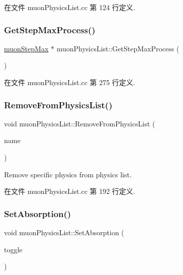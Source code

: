 在文件 muon\+Physics\+List.\+cc 第 124 行定义.

\mbox{\label{classmuonPhysicsList_a673fde0059508d78547a84db91971ce9}} 
\subsubsection{\texorpdfstring{Get\+Step\+Max\+Process()}{GetStepMaxProcess()}}
{\footnotesize\ttfamily \hyperlink{classmuonStepMax}{muon\+Step\+Max} $\ast$ muon\+Physics\+List\+::\+Get\+Step\+Max\+Process (\begin{DoxyParamCaption}{ }\end{DoxyParamCaption})}



在文件 muon\+Physics\+List.\+cc 第 275 行定义.

\mbox{\label{classmuonPhysicsList_aaba742da0c9dc44a6498bfc804e284eb}} 
\subsubsection{\texorpdfstring{Remove\+From\+Physics\+List()}{RemoveFromPhysicsList()}}
{\footnotesize\ttfamily void muon\+Physics\+List\+::\+Remove\+From\+Physics\+List (\begin{DoxyParamCaption}\item[{const G4\+String \&}]{name }\end{DoxyParamCaption})}



Remove specific physics from physics list. 



在文件 muon\+Physics\+List.\+cc 第 192 行定义.

\mbox{\label{classmuonPhysicsList_afe6f5f4bcf37f721cd821753ace0b06d}} 
\subsubsection{\texorpdfstring{Set\+Absorption()}{SetAbsorption()}}
{\footnotesize\ttfamily void muon\+Physics\+List\+::\+Set\+Absorption (\begin{DoxyParamCaption}\item[{G4bool}]{toggle }\end{DoxyParamCaption})}



